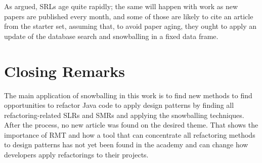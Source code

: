As argued, SRLs age quite rapidly; the same will happen with work as new papers are published every month, and some of those are likely to cite an article from the starter set, assuming that, to avoid paper aging, they ought to apply an update of the database search and snowballing in a fixed data frame.

\section{Closing Remarks}
\label{sec-cloasing-remarks}

The main application of snowballing in this work is to find new methods to find opportunities to refactor Java code to apply design patterns by finding all refactoring-related SLRs and SMRs and applying the snowballing techniques. After the process, no new article was found on the desired theme. That shows the importance of RMT and how a tool that can concentrate all refactoring methods to design patterns has not yet been found in the academy and can change how developers apply refactorings to their projects.